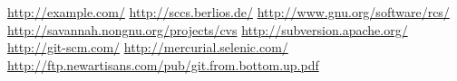 \documentclass[a4paper]{article}
\begin{document}
\newpage

\begin{thebibliography}{99}
   \url{http://example.com/} 
  \url{http://sccs.berlios.de/} 
  \url{http://www.gnu.org/software/rcs/} 
  \url{http://savannah.nongnu.org/projects/cvs} 
  \url{http://subversion.apache.org/}  \url{http://git-scm.com/}
   \url{http://mercurial.selenic.com/}
  \url{http://ftp.newartisans.com/pub/git.from.bottom.up.pdf}
  \end{thebibliography}
\end{document}
